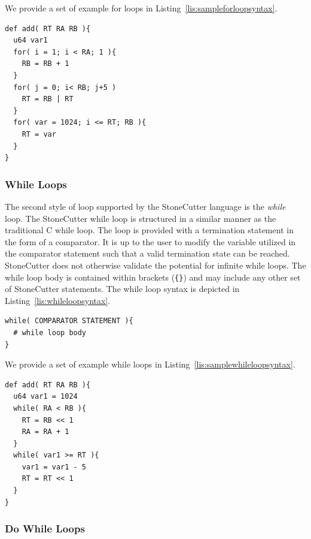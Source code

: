 \documentclass{article}
\begin{document}
We provide a set of example for loops in Listing~\ref{lis:sampleforloopsyntax}.  

\vspace{0.125in}
\begin{lstlisting}[frame=single,style=base,caption={Sample For Loop Syntax},captionpos=b,label={lis:sampleforloopsyntax}]
def add( RT RA RB ){
  u64 var1
  for( i = 1; i < RA; 1 ){
    RB = RB + 1
  }
  for( j = 0; i< RB; j+5 )
    RT = RB | RT
  }
  for( var = 1024; i <= RT; RB ){
    RT = var
  }
}
\end{lstlisting}

\clearpage
\subsubsection{While Loops}
\label{sec:WhileLoops}

The second style of loop supported by the StoneCutter language is the \textit{while} loop.  The StoneCutter 
while loop is structured in a similar manner as the traditional C while loop.  The loop is provided with a 
termination statement in the form of a comparator.  It is up to the user to modify the variable utilized 
in the comparator statement such that a valid termination state can be reached.  StoneCutter does not otherwise 
validate the potential for infinite while loops.  The while loop body is contained within brackets 
(\texttt{\{\}}) and may include any other set of StoneCutter statements.  The while loop syntax is depicted in 
Listing~\ref{lis:whileloopsyntax}.  

\vspace{0.125in}
\begin{lstlisting}[frame=single,style=base,caption={While Loop Syntax},captionpos=b,label={lis:whileloopsyntax}]
while( COMPARATOR STATEMENT ){
  # while loop body
}
\end{lstlisting}

We provide a set of example while loops in Listing~\ref{lis:samplewhileloopsyntax}.

\vspace{0.125in}
\begin{lstlisting}[frame=single,style=base,caption={Sample While Loop Syntax},captionpos=b,label={lis:samplewhileloopsyntax}]
def add( RT RA RB ){
  u64 var1 = 1024
  while( RA < RB ){
    RT = RB << 1
    RA = RA + 1
  }
  while( var1 >= RT ){
    var1 = var1 - 5
    RT = RT << 1
  }
}
\end{lstlisting}

\clearpage
\subsubsection{Do While Loops}
\label{sec:DoWhileLoops}
\end{document}
